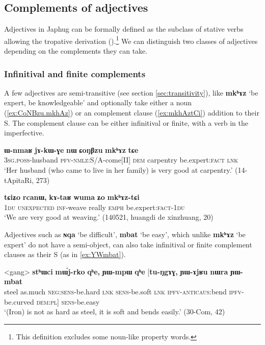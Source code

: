 \documentclass[oneside,a4paper,11pt]{article}
\newcommand{\ipa}[1]{\textbf{\phon#1}} %
\newcommand{\jpg}[2]{\ipa{#1} `#2'} %
\begin{document}
\subsection{Complements of adjectives} \label{sec:adj}
Adjectives in Japhug can be formally defined as the subclass of stative verbs allowing the tropative derivation (\citealt{jacques13tropative}).\footnote{This definition excludes some noun-like property words.} We can distinguish two classes of adjectives depending on the complements they can take.


\subsubsection{Infinitival and finite complements} \label{sec:adj.infinitive}
A few adjectives are semi-transitive (see section \ref{sec:transitivity}), like \jpg{mkʰɤz}{be expert, be knowledgeable} and optionally take either a noun (\ref{ex:CoNBzu.mkhAz}) or an complement clause (\ref{ex:mkhAztCi}) addition to their S. The complement clause can be either infinitival or finite, with a verb in the imperfective.

\begin{exe}
\ex \label{ex:CoNBzu.mkhAz}
\gll 
\ipa{ɯ-nmaʁ} 	\ipa{jɤ-kɯ-ɣe} 	\ipa{nɯ} 	\ipa{ɕoŋβzu} 	\ipa{mkʰɤz} 	\ipa{tɕe} \\
\textsc{3sg.poss}-husband \textsc{pfv-nmlz}:S/A-come[II] \textsc{dem} carpentry be.expert:\textsc{fact} \textsc{lnk} \\
\glt `Her husband (who came to live in her family) is very good at carpentry.' (14-tApitaRi, 273)
\end{exe}

\begin{exe}
\ex \label{ex:mkhAztCi}
\gll \ipa{tɕiʑo} 	\ipa{rcanɯ,} 	\ipa{kɤ-taʁ} 	\ipa{wuma} 	\ipa{ʑo} 	\ipa{mkʰɤz-tɕi} 	 \\
\textsc{1du}  \textsc{unexpected} \textsc{inf}-weave really \textsc{emph} be.expert:\textsc{fact}-\textsc{1du} \\
\glt `We are very good at weaving.' (140521, huangdi de xinzhuang, 20)
\end{exe}

Adjectives such as \jpg{ɴqa}{be difficult}, \jpg{mbat}{be easy}, which unlike \jpg{mkʰɤz}{be expert} do not have a semi-object, can also take infinitival or finite complement clauses as their S (as in \ref{ex:YWmbat}).

\begin{exe}
\ex \label{ex:YWmbat}
\gll
<gang> 	\ipa{stʰɯci} 	\ipa{mɯ́j-rko} 	\ipa{qʰe,} 	\ipa{ɲɯ-mpɯ} 	\ipa{qʰe} 	[\ipa{tu-ŋgɤɣ,} 	\ipa{ɲɯ-ɤjʁu} 	\ipa{nɯra} 	\ipa{ɲɯ-mbat} \\
steel as.much \textsc{neg:sens}-be.hard \textsc{lnk} \textsc{sens}-be.soft \textsc{lnk} \textsc{ipfv-anticaus}:bend \textsc{ipfv}-be.curved  \textsc{dem:pl}] \textsc{sens}-be.easy \\
\glt `(Iron) is not as hard as steel, it is soft and bends easily.' (30-Com, 42)
\end{exe}
\end{document}
